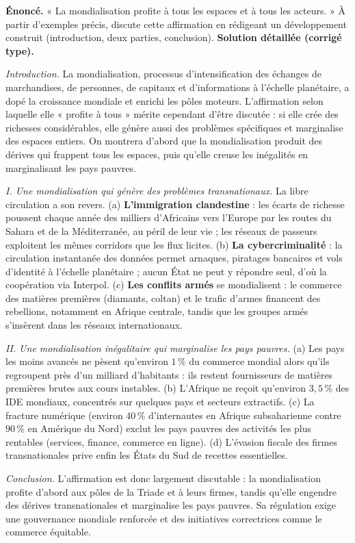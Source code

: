 \documentclass[11pt]{article}
\begin{document}
\begin{exoresolu}
\textbf{Énoncé.} « La mondialisation profite à tous les espaces et à tous les acteurs. » À partir d'exemples précis, discute cette affirmation en rédigeant un développement construit (introduction, deux parties, conclusion).
\tcblower
\textbf{Solution détaillée (corrigé type).}

\emph{Introduction.} La mondialisation, processus d'intensification des échanges de marchandises, de personnes, de capitaux et d'informations à l'échelle planétaire, a dopé la croissance mondiale et enrichi les pôles moteurs. L'affirmation selon laquelle elle « profite à tous » mérite cependant d'être discutée : si elle crée des richesses considérables, elle génère aussi des problèmes spécifiques et marginalise des espaces entiers. On montrera d'abord que la mondialisation produit des dérives qui frappent tous les espaces, puis qu'elle creuse les inégalités en marginalisant les pays pauvres.

\emph{I. Une mondialisation qui génère des problèmes transnationaux.} La libre circulation a son revers. (a) \textbf{L'immigration clandestine} : les écarts de richesse poussent chaque année des milliers d'Africains vers l'Europe par les routes du Sahara et de la Méditerranée, au péril de leur vie ; les réseaux de passeurs exploitent les mêmes corridors que les flux licites. (b) \textbf{La cybercriminalité} : la circulation instantanée des données permet arnaques, piratages bancaires et vols d'identité à l'échelle planétaire ; aucun État ne peut y répondre seul, d'où la coopération via Interpol. (c) \textbf{Les conflits armés} se mondialisent : le commerce des matières premières (diamants, coltan) et le trafic d'armes financent des rebellions, notamment en Afrique centrale, tandis que les groupes armés s'insèrent dans les réseaux internationaux.

\emph{II. Une mondialisation inégalitaire qui marginalise les pays pauvres.} (a) Les pays les moins avancés ne pèsent qu'environ $1\,\%$ du commerce mondial alors qu'ils regroupent près d'un milliard d'habitants : ils restent fournisseurs de matières premières brutes aux cours instables. (b) L'Afrique ne reçoit qu'environ $3,5\,\%$ des IDE mondiaux, concentrés sur quelques pays et secteurs extractifs. (c) La fracture numérique (environ $40\,\%$ d'internautes en Afrique subsaharienne contre $90\,\%$ en Amérique du Nord) exclut les pays pauvres des activités les plus rentables (services, finance, commerce en ligne). (d) L'évasion fiscale des firmes transnationales prive enfin les États du Sud de recettes essentielles.

\emph{Conclusion.} L'affirmation est donc largement discutable : la mondialisation profite d'abord aux pôles de la Triade et à leurs firmes, tandis qu'elle engendre des dérives transnationales et marginalise les pays pauvres. Sa régulation exige une gouvernance mondiale renforcée et des initiatives correctrices comme le commerce équitable.
\end{exoresolu}
\end{document}
